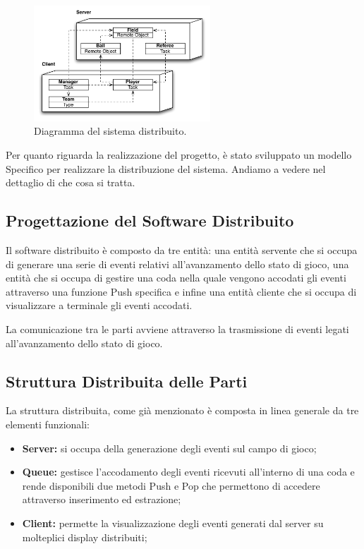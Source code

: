 \documentclass[aps,letterpaper,10pt]{article}
\begin{document}
\begin{figure}[H]
	\begin{center}
		\includegraphics[width=250px]{images/distributed-system.pdf}
	\end{center}
\caption{Diagramma del sistema distribuito.}
\end{figure}

Per quanto riguarda la realizzazione del progetto, è stato sviluppato un modello Specifico per realizzare la distribuzione del sistema. Andiamo a vedere nel dettaglio di che cosa si tratta.

\subsection{Progettazione del Software Distribuito}

Il software distribuito \`e composto da tre entit\`a: una entit\`a servente che si occupa di generare una serie di eventi relativi all'avanzamento dello stato di gioco, una entit\`a che si occupa di gestire una coda nella quale vengono accodati gli eventi attraverso una funzione Push specifica e infine una entit\`a cliente che si occupa di visualizzare a terminale gli eventi accodati. \vspace{3mm}

La comunicazione tra le parti avviene attraverso la trasmissione di eventi legati all'avanzamento dello stato di gioco. 

\subsection{Struttura Distribuita delle Parti}

La struttura distribuita, come gi\`a menzionato \`e composta in linea generale da tre elementi funzionali:

\begin{itemize}
	\item \textbf{Server:} si occupa della generazione degli eventi sul campo di gioco;
	\item \textbf{Queue:} gestisce l'accodamento degli eventi ricevuti all'interno di una coda e rende disponibili due metodi Push e Pop che permettono di accedere attraverso inserimento ed estrazione;
	\item \textbf{Client:} permette la visualizzazione degli eventi generati dal server su molteplici display distribuiti;
\end{itemize}
\end{document}
